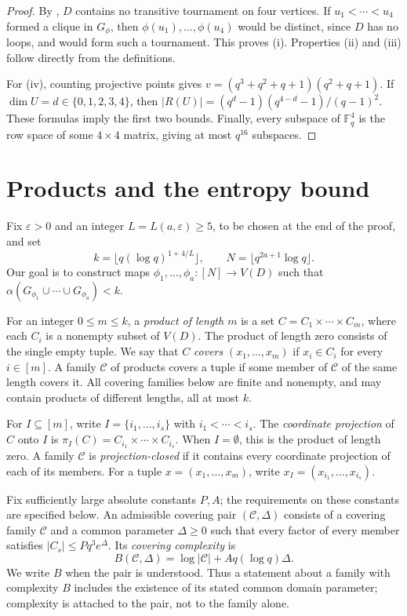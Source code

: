 \documentclass[11pt,a4paper]{article}
\numberwithin{equation}{section}
\newcommand{\Fq}{\mathbb F_q}
\newcommand{\cC}{\mathcal C}
\newcommand{\eps}{\varepsilon}
\begin{document}
\begin{proof}
By \cite[Lemma~2.11, with parameter $3$]{Bradac}, $D$ contains
no transitive tournament on four vertices.
If $u_1<\cdots<u_4$ formed a clique in $G_\phi$, then
$\phi(u_1),\ldots,\phi(u_4)$ would be distinct, since $D$ has no
loops, and would form such a tournament. This proves (i).
Properties (ii) and (iii) follow directly from the definitions.

For (iv), counting projective points gives
$v=(q^3+q^2+q+1)(q^2+q+1)$.
If $\dim U=d\in\{0,1,2,3,4\}$, then
$|R(U)|=(q^d-1)(q^{4-d}-1)/(q-1)^2$.
These formulas imply the first two bounds.
Finally, every subspace of $\Fq^4$ is the row space of some
$4\times4$ matrix, giving at most $q^{16}$ subspaces.
\end{proof}

\section{Products and the entropy bound}\label{sec:products}

Fix $\eps>0$ and an integer $L=L(a,\eps)\ge5$, to be chosen at
the end of the proof, and set
\begin{equation}\label{eq:scale}
 k=\lfloor q(\log q)^{1+4/L}\rfloor,\qquad
 N=\lfloor q^{2a+1}\log q\rfloor.
\end{equation}
Our goal is to construct maps
$\phi_1,\ldots,\phi_a:[N]\to V(D)$ such that
$\alpha(G_{\phi_1}\cup\cdots\cup G_{\phi_a})<k$.

For an integer $0\le m\le k$, a \emph{product of length $m$}
is a set $C=C_1\times\cdots\times C_m$, where each
$C_i$ is a nonempty subset of $V(D)$.
The product of length zero consists of the single empty tuple.
We say that $C$ \emph{covers} $(x_1,\ldots,x_m)$ if
$x_i\in C_i$ for every $i\in[m]$.
A family $\cC$ of products covers a tuple if some member of
$\cC$ of the same length covers it. All covering families below
are finite and nonempty, and may contain products of different
lengths, all at most $k$.

For $I\subseteq[m]$, write $I=\{i_1,\ldots,i_s\}$ with
$i_1<\cdots<i_s$. The \emph{coordinate projection} of $C$ onto
$I$ is $\pi_I(C)=C_{i_1}\times\cdots\times C_{i_s}$.
When $I=\emptyset$, this is the product of length zero.
A family $\cC$ is \emph{projection-closed} if it contains every
coordinate projection of each of its members.
For a tuple $x=(x_1,\ldots,x_m)$, write
$x_I=(x_{i_1},\ldots,x_{i_s})$.

Fix sufficiently large absolute constants $P,A$; the requirements
on these constants are specified below.
An admissible covering pair $(\cC,\Delta)$ consists of a covering
family $\cC$ and a common parameter $\Delta\ge0$ such that every
factor of every member satisfies $|C_s|\le Pq^3e^\Delta$.
Its \emph{covering complexity} is
\begin{equation}\label{eq:domains}
 B(\cC,\Delta)=\log|\cC|+Aq(\log q)\Delta.
\end{equation}
We write $B$ when the pair is understood.
Thus a statement about a family with complexity $B$ includes the
existence of its stated common domain parameter; complexity is
attached to the pair, not to the family alone.
\end{document}
